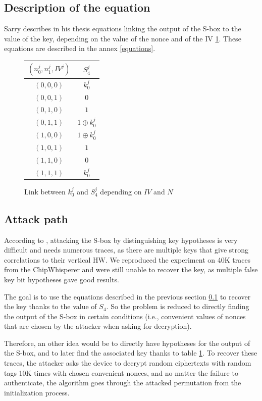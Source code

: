 \documentclass[11pt,technote]{IEEEtran}
\begin{document}
	\subsection{Description of the equation} \label{sec_equ}
	Sarry \cite{these} describes in his thesis equations linking the output of the S-box to the value of the key, depending on the value of the nonce and of the IV \ref{link_k_s4}. These equations are described in the annex \ref{equations}.
	
	\begin{figure}[h]
		\centering
		\begin{tabular}{|c|c|}
			\hline
			$(n_0^j,n_1^j,IV^j)$&$S_4^j$\\
			\hline\hline
			$(0,0,0)$&$k_0^j$\\
			\hline
			$(0,0,1)$&$0$\\
			\hline
			$(0,1,0)$&$1$\\
			\hline
			$(0,1,1)$&$1 \oplus k_0^j$\\
			\hline
			$(1,0,0)$&$1 \oplus k_0^j$\\
			\hline
			$(1,0,1)$&$1$\\
			\hline
			$(1,1,0)$&$0$\\
			\hline
			$(1,1,1)$&$k_0^j$\\
			\hline
		\end{tabular}
		\caption{Link between $k_0^j$ and $S_4^j$ depending on $IV$ and $N$}
		\label{link_k_s4}
	\end{figure}
	
	\subsection{Attack path}
	According to \cite{cpa_analysis}, attacking the S-box by distinguishing key hypotheses is very difficult and needs numerous traces, as there are multiple keys that give strong correlations to their vertical HW. We reproduced the experiment on 40K traces from the ChipWhisperer and were still unable to recover the key, as multiple false key bit hypotheses gave good results.
	
	The goal is to use the equations described in the previous section \ref{sec_equ} to recover the key thanks to the value of $S_4$. So the problem is reduced to directly finding the output of the S-box in certain conditions (i.e., convenient values of nonces that are chosen by the attacker when asking for decryption). 
	
	Therefore, an other idea would be to directly have hypotheses for the output of the S-box, and to later find the associated key thanks to table \ref{link_k_s4}. To recover these traces, the attacker asks the device to decrypt random ciphertexts with random tags 10K times with chosen convenient nonces, and no matter the failure to authenticate, the algorithm goes through the attacked permutation from the initialization process.
	
\end{document}
